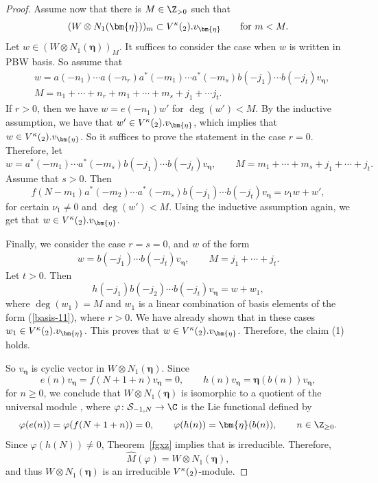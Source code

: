 \documentclass[pdftex]{sigma}
\numberwithin{equation}{section}
\theoremstyle{definition}
\newcommand{\1}{\textbf{1}}
\begin{document}
\begin{proof}
Assume now that there is $M \in {\Z}_{>0}$ such that
 \[( W \otimes N_1(\bm{\eta}) )_m \subset V^{\kappa}(\sl_2). v_{\bm{\eta}} \qquad \mbox{for} \ m < M. \]
Let $w \in ( W\otimes N_1(\bm{\eta}) )_M$. It suffices to consider the case when $w $ is written in PBW basis. So assume that
\begin{align}
&w=a(-n_1)\cdots a(-n_r)a^*(-m_1)\cdots a^*(-m_s)b(-j_1)\cdots b(-j_t)v_{\bm{\eta}}, \label{basis-11} \\
&M= n_1 + \cdots + n_r + m_1 +\cdots + m_s + j_1 +\cdots j_t. \nonumber
\end{align}
If $r >0$, then we have $ w= e(-n_1) w'$ for $\deg(w') < M$. By the inductive assumption, we have that $w ' \in V^{\kappa}(\sl_2). v_{\bm{\eta}}$, which implies that $w \in V^{\kappa}(\sl_2). v_{\bm{\eta}}$.
So it suffices to prove the statement in the case $r=0$. Therefore, let
 \[w= a^*(-m_1) \cdots a^* (-m_s) b(-j_1) \cdots b(-j_t) v_{\bm{\eta}}, \qquad
  M= m_1 +\cdots + m_s + j_1 +\cdots +j_t. \]
Assume that $s >0$. Then
 \[ f(N-m_1) a^*(-m_2) \cdots a^* (-m_s) b(-j_1) \cdots b(-j_t) v_{\bm{\eta}} = \nu_1 w + w', \]
for certain $\nu_1 \ne 0$ and $\deg(w') <M$. Using the inductive assumption again, we get that $w \in V^{\kappa}(\sl_2). v_{\bm{\eta}}$.

Finally, we consider the case $r= s=0$, and $w$ of the form
 \begin{align*}
 w= b(-j_1) \cdots b(-j_t) v_{\bm{\eta}}, \qquad
 M= j_1 +\cdots +j_t.
 \end{align*}
Let $t >0$. Then
 \[ h(-j_1) b(-j_2) \cdots b(-j_t) v_{\bm{\eta}} = w + w_1, \]
where $\deg(w_1) = M $ and $w_1$ is a linear combination of basis elements of the form (\ref{basis-11}), where ${r >0}$. We have already shown that in these cases $w_1 \in V^{\kappa}(\sl_2). v_{\bm{\eta}}$. This proves that $w \in V^{\kappa}(\sl_2). v_{\bm{\eta}}$. Therefore, the claim (1) holds.

So $v_{\bm{\eta}}$ is cyclic vector in $ W\otimes N_1({\bm{\eta}})$. Since
 \[ e(n) v_ {\bm{\eta}} = f(N+1 + n) v_ {\bm{\eta}} =0, \qquad h(n) v_ {\bm{\eta}} = {\bm{\eta}} (b(n)) v_ {\bm{\eta}}, \]
 for $n\geq 0$,
we conclude that $ W\otimes N_1({\bm{\eta}})$ is isomorphic to a quotient of the universal module , where
$ \varphi\colon \mathcal S_{-1, N} \rightarrow {\C}$ is the Lie functional defined by
 \[ \varphi(e(n)) = \varphi(f(N+1+ n)) =0, \qquad \varphi(h(n)) = {\bm{\eta}} (b(n)), \qquad n \in {\Z}_{\ge 0}. \]
Since $ \varphi(h(N)) \ne 0$, Theorem~\ref{fgxz} implies that  is irreducible. Therefore,
 \[ \widehat{M}(\varphi) = W \otimes N_1({\bm{\eta}}), \]
and thus $W\otimes N_1({\bm{\eta}})$ is an irreducible $ V^{\kappa}(\sl_2)$-module.
\end{proof}
\end{document}
